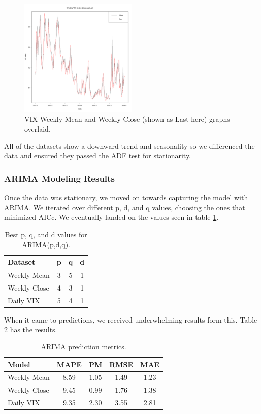 \documentclass[twocolumn]{article}
\begin{document}
\begin{figure}[h!]
    \centering
    \includegraphics[width=0.5\textwidth]{vix_mean_vs_close_graph.png}
    \caption{VIX Weekly Mean and Weekly Close (shown as Last here) graphs overlaid.}
    \label{fig:vix-weekly-mean-visual-inspection}
\end{figure}


All of the datasets show a downward trend and seasonality so we differenced the data and ensured they passed the ADF test for stationarity.

\subsubsection*{ARIMA Modeling Results}

Once the data was stationary, we moved on towards capturing the model with ARIMA. We iterated over different p, d, and q values, choosing the ones that minimized AICc. We eventually landed on the values seen in table \ref{tab:vix-arima-results}.

\begin{table}[h!]
\centering
\small
\begin{tabular}{|l|c|c|c|}
\hline
\textbf{Dataset} & \textbf{p} & \textbf{q} & \textbf{d} \\
\hline
Weekly Mean & 3 & 5 & 1 \\
Weekly Close & 4 & 3 & 1 \\
Daily VIX & 5 & 4 & 1 \\
\hline
\end{tabular}
\caption{Best p, q, and d values for ARIMA(p,d,q).}
\label{tab:vix-arima-results}
\end{table}

When it came to predictions, we received underwhelming results form this. Table \ref{tab:arima-metrics} has the results.

\begin{table}[h!]
\centering
\small
\begin{tabular}{|l|c|c|c|c|}
\hline
\textbf{Model} & \textbf{MAPE} & \textbf{PM} & \textbf{RMSE} & \textbf{MAE} \\
\hline
Weekly Mean & 8.59 & 1.05 & 1.49 & 1.23 \\
Weekly Close & 9.45 & 0.99 & 1.76 & 1.38 \\
Daily VIX & 9.35 & 2.30 & 3.55 & 2.81 \\
\hline
\end{tabular}
\caption{ARIMA prediction metrics.}
\label{tab:arima-metrics}
\end{table}
\end{document}
